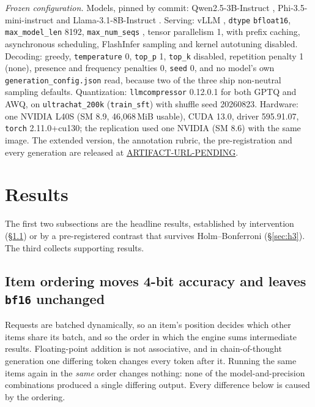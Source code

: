 \documentclass[conference]{IEEEtran}
\begin{document}
\emph{Frozen configuration.} Models, pinned by commit: Qwen2.5-3B-Instruct
{\small\texttt{}}, Phi-3.5-mini-instruct
{\small\texttt{}} and Llama-3.1-8B-Instruct
{\small\texttt{}}. Serving: vLLM
\hEightEngine{}, \texttt{dtype} \texttt{bfloat16}, \texttt{max\_model\_len} 8192,
\texttt{max\_num\_seqs} \hEightFrozenB{}, tensor parallelism 1, with prefix caching,
asynchronous scheduling, FlashInfer sampling and kernel autotuning disabled. Decoding: greedy,
\texttt{temperature} 0, \texttt{top\_p} 1, \texttt{top\_k} disabled, repetition penalty 1
(none), presence and frequency penalties 0, \texttt{seed} 0, and no model's own
\texttt{generation\_config.json} read, because two of the three ship non-neutral sampling
defaults. Quantization: \texttt{llmcompressor} 0.12.0.1 for both GPTQ and AWQ, on
\texttt{ultrachat\_200k} (\texttt{train\_sft}) with shuffle seed 20260823. Hardware: one
NVIDIA L40S (SM 8.9, 46{,}068\,MiB usable), CUDA 13.0, driver 595.91.07, \texttt{torch}
2.11.0+cu130; the replication used one NVIDIA \hEightSpotGPU{} (SM 8.6) with the same image.
The extended version, the annotation rubric, the pre-registration and every generation are
released at \url{ARTIFACT-URL-PENDING}.

\section{Results}
\label{sec:results}

The first two subsections are the headline results, established by intervention
(\S\ref{sec:h8}) or by a pre-registered contrast that survives Holm--Bonferroni
(\S\ref{sec:h3}). The third collects supporting results.

\subsection{Item ordering moves 4-bit accuracy and leaves \texttt{bf16} unchanged}
\label{sec:h8}

Requests are batched dynamically, so an item's position decides which other items share its
batch, and so the order in which the engine sums intermediate results. Floating-point
addition is not associative, and in chain-of-thought generation one differing token changes
every token after it. Running the same items again in the \emph{same} order changes nothing:
none of the \hEightNCells{} model-and-precision combinations produced a single differing
output. Every difference below is caused by the ordering.
\end{document}
